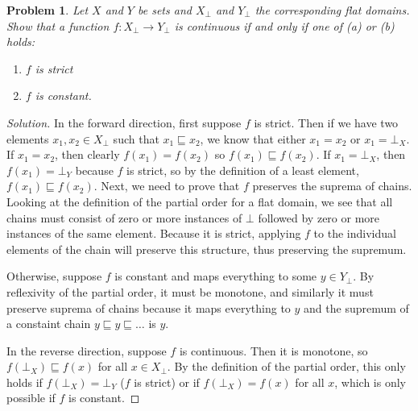 \documentclass{article}
\newtheorem{problem}{Problem}[section]}
\begin{document}
\begin{problem}
    Let $X$ and $Y$ be sets and $X_\bot$ and $Y_\bot$ the corresponding flat
    domains. Show that a function $f : X_\bot\rightarrow Y_\bot$ is continuous
    if and only if one of (a) or (b) holds:
    \begin{enumerate}[label=(\alph*)]
        \item $f$ is strict
        \item $f$ is constant.
    \end{enumerate}
\end{problem}
\begin{proof}[Solution]
    In the forward direction, first suppose $f$ is strict. Then if we have two
    elements $x_1,x_2\in X_\bot$ such that $x_1\sqsubseteq x_2$, we know that
    either $x_1=x_2$ or $x_1=\bot_X$. If $x_1=x_2$, then clearly $f(x_1)=f(x_2)$
    so $f(x_1)\sqsubseteq f(x_2)$. If $x_1=\bot_X$, then $f(x_1)=\bot_Y$ because
    $f$ is strict, so by the definition of a least element, $f(x_1)\sqsubseteq
    f(x_2)$. Next, we need to prove that $f$ preserves the suprema of chains.
    Looking at the definition of the partial order for a flat domain, we see
    that all chains must consist of zero or more instances of $\bot$ followed by
    zero or more instances of the same element. Because it is strict, applying
    $f$ to the individual elements of the chain will preserve this structure,
    thus preserving the supremum.

    Otherwise, suppose $f$ is constant and maps everything to some $y\in
    Y_\bot$. By reflexivity of the partial order, it must be monotone, and
    similarly it must preserve suprema of chains because it maps everything to
    $y$ and the supremum of a constaint chain $y\sqsubseteq y\sqsubseteq\dots$
    is $y$.

    In the reverse direction, suppose $f$ is continuous. Then it is monotone, so
    $f(\bot_X)\sqsubseteq f(x)$ for all $x\in X_\bot$. By the definition of the
    partial order, this only holds if $f(\bot_X)=\bot_Y$ ($f$ is strict) or if
    $f(\bot_X)=f(x)$ for all $x$, which is only possible if $f$ is constant.
\end{proof}
\end{document}

